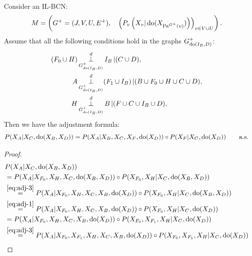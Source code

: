 \begin{Thm}
    \label{thm-gen-adjustment}
Consider an IL-BCN:
    \[ M = \left ( G^+=(J,V,U,E^+),\quad \left ( P_v\left ( X_v|\operatorname{do}(X_{\mathrm{Pa}^{G^+}(v)})   \right )\right )_{v\in V \cup U} \right ). \]
    Assume that all the following conditions hold in the graphs $G^+_{\operatorname{do}(I_B,D)}$: %
    \begin{align}
        (F_0 \cup H) & \operatorname*{\perp}^d_{G^+_{\operatorname{do}(I_B,D)}} I_B \operatorname*{|} (C \cup D), \label{eq:adj-1} \\
        A & \operatorname*{\perp}^d_{G^+_{\operatorname{do}(I_B,D)}} (F_1 \cup I_B) \operatorname*{|} (B \cup F_0 \cup H \cup C \cup D),\label{eq:adj-3} \\
                      H &\operatorname*{\perp}^d_{G^+_{\operatorname{do}(I_B,D)}} B \operatorname*{|} (F \cup C \cup  I_B \cup D). \label{eq:adj-5} 
    \end{align}
Then we have the adjustment formula:
\[ P(X_A|X_C,\operatorname{do}(X_B,X_D)) = 
    P(X_A|X_B,X_C,X_F,\operatorname{do}(X_D)) \circ P(X_F|X_C,\operatorname{do}(X_D)) \qquad \text{a.s.}
\]
\begin{proof}
    \begin{align}
 & P(X_A|X_C,\doit(X_B,X_D)) \\
 &= P(X_A|X_{F_0},X_H,X_C,\doit(X_B,X_D)) \circ P(X_{F_0},X_H|X_C,\doit(X_B,X_D))\\
 &\stackrel{\ref{eq:adj-3}}{=}
 P(X_A|X_{F_0},X_H,X_C,X_B,\doit(X_D))\circ P(X_{F_0},X_H|X_C,\doit(X_B,X_D)) \\
 &\stackrel{\ref{eq:adj-1}}{=}
 P(X_A|X_{F_0},X_H,X_C,X_B,\doit(X_D))\circ P(X_{F_0},X_H|X_C,\doit(X_D)) \\
 &\stackrel{}{=}
 P(X_A|X_{F_0},X_H,X_C,X_B,\doit(X_D))\circ P(X_{F_0},X_{F_1},X_H|X_C,\doit(X_D)) \\
 & \stackrel{\ref{eq:adj-3}}{=}
 P(X_A|X_{F_0},X_{F_1},X_H,X_C,X_B,\doit(X_D))\circ P(X_{F_0},X_{F_1},X_H|X_C,\doit(X_D)) \\

\end{align}
\end{proof}
\end{Thm}
